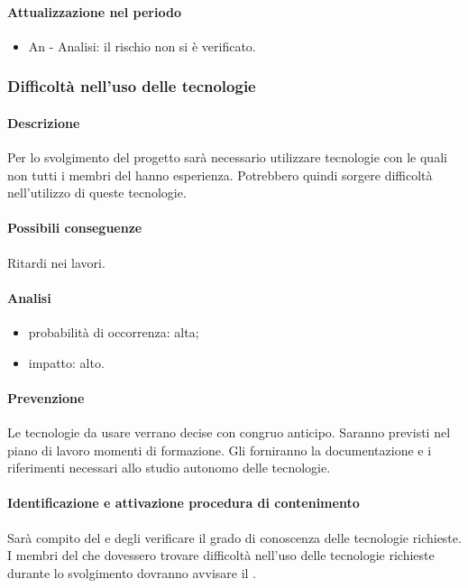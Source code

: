 			\paragraph{Attualizzazione nel periodo}
				\begin{itemize}
				\item{An - Analisi}: il rischio non si è verificato.
				\end{itemize}

		\subsubsection {Difficoltà nell'uso delle tecnologie}
		\label{subsec:difficoltaTecnol}
			\paragraph{Descrizione}
			Per lo svolgimento del progetto sarà necessario utilizzare tecnologie con le quali non tutti i membri del  hanno esperienza. Potrebbero quindi sorgere difficoltà nell'utilizzo di queste tecnologie.
			\paragraph{Possibili conseguenze} Ritardi nei lavori.
			\paragraph{Analisi}
			\begin{itemize}
			\item{probabilità di occorrenza:} alta;
			\item{impatto:} alto.
			\end{itemize}
			\paragraph{Prevenzione}
			Le tecnologie da usare verrano decise con congruo anticipo. Saranno previsti nel piano di lavoro momenti di formazione. Gli \amministratori{} forniranno la documentazione e i riferimenti necessari allo studio autonomo delle tecnologie.
			\paragraph{Identificazione e attivazione procedura di contenimento}
			Sarà compito del \responsabilediprogetto{} e degli \amministratori{} verificare il grado di conoscenza delle tecnologie richieste. I membri del  che dovessero trovare difficoltà nell'uso delle tecnologie richieste durante lo svolgimento dovranno avvisare il \responsabilediprogetto.

